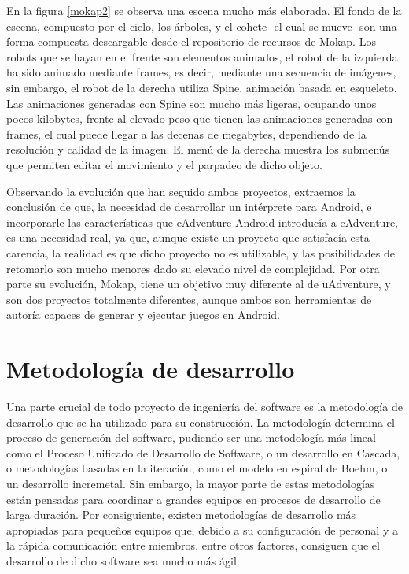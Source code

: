 En la figura \ref{mokap2} se observa una escena mucho más elaborada. El fondo de la escena, compuesto por el cielo, los árboles, y el cohete -el cual se mueve- son una forma compuesta descargable desde el repositorio de recursos de Mokap. Los robots que se hayan en el frente son elementos animados, el robot de la izquierda ha sido animado mediante frames, es decir, mediante una secuencia de imágenes, sin embargo, el robot de la derecha utiliza Spine, animación basada en esqueleto. Las animaciones generadas con Spine son mucho más ligeras, ocupando unos pocos kilobytes, frente al elevado peso que tienen las animaciones generadas con frames, el cual puede llegar a las decenas de megabytes, dependiendo de la resolución y calidad de la imagen. El menú de la derecha muestra los submenús que permiten editar el movimiento y el parpadeo de dicho objeto.

Observando la evolución que han seguido ambos proyectos, extraemos la conclusión de que, la necesidad de desarrollar un intérprete para Android, e incorporarle las características que eAdventure Android introducía a eAdventure, es una necesidad real, ya que, aunque existe un proyecto que satisfacía esta carencia, la realidad es que dicho proyecto no es utilizable, y las posibilidades de retomarlo son mucho menores dado su elevado nivel de complejidad. Por otra parte su evolución, Mokap, tiene un objetivo muy diferente al de uAdventure, y son dos proyectos totalmente diferentes, aunque ambos son herramientas de autoría capaces de generar y ejecutar juegos en Android.

\section{Metodología de desarrollo}
\label{metodologiadedesarrollo}

Una parte crucial de todo proyecto de ingeniería del software es la metodología de desarrollo que se ha utilizado para su construcción. La metodología determina el proceso de generación del software, pudiendo ser una metodología más lineal como el Proceso Unificado de Desarrollo de Software, o un desarrollo en Cascada, o metodologías basadas en la iteración, como el modelo en espiral de Boehm, o un desarrollo incremetal. Sin embargo, la mayor parte de estas metodologías están pensadas para coordinar a grandes equipos en procesos de desarrollo de larga duración. Por consiguiente, existen metodologías de desarrollo más apropiadas para pequeños equipos que, debido a su configuración de personal y a la rápida comunicación entre miembros, entre otros factores, consiguen que el desarrollo de dicho software sea mucho más ágil.

